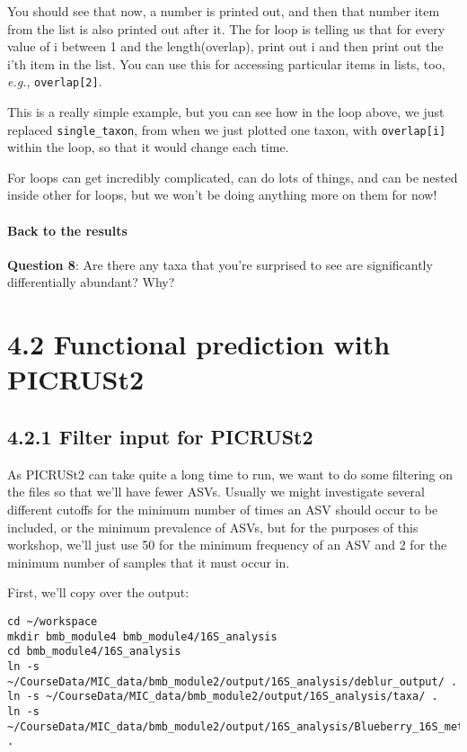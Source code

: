 \documentclass[
]{book}
\begin{document}
You should see that now, a number is printed out, and then that number item from the list is also printed out after it. The for loop is telling us that for every value of i between 1 and the length(overlap), print out i and then print out the i'th item in the list. You can use this for accessing particular items in lists, too, \emph{e.g.}, \texttt{overlap{[}2{]}}.

This is a really simple example, but you can see how in the loop above, we just replaced \texttt{single\_taxon}, from when we just plotted one taxon, with \texttt{overlap{[}i{]}} within the loop, so that it would change each time.

For loops can get incredibly complicated, can do lots of things, and can be nested inside other for loops, but we won't be doing anything more on them for now!

\paragraph{Back to the results}\label{back-to-the-results}

\textbf{Question 8}: Are there any taxa that you're surprised to see are significantly differentially abundant? Why?

\section{4.2 Functional prediction with PICRUSt2}\label{functional-prediction-with-picrust2-1}

\subsection{4.2.1 Filter input for PICRUSt2}\label{filter-input-for-picrust2}

As PICRUSt2 can take quite a long time to run, we want to do some filtering on the files so that we'll have fewer ASVs. Usually we might investigate several different cutoffs for the minimum number of times an ASV should occur to be included, or the minimum prevalence of ASVs, but for the purposes of this workshop, we'll just use 50 for the minimum frequency of an ASV and 2 for the minimum number of samples that it must occur in.

First, we'll copy over the output:

\begin{verbatim}
cd ~/workspace
mkdir bmb_module4 bmb_module4/16S_analysis
cd bmb_module4/16S_analysis
ln -s ~/CourseData/MIC_data/bmb_module2/output/16S_analysis/deblur_output/ .
ln -s ~/CourseData/MIC_data/bmb_module2/output/16S_analysis/taxa/ .
ln -s ~/CourseData/MIC_data/bmb_module2/output/16S_analysis/Blueberry_16S_metadata.tsv .
\end{verbatim}
\end{document}
